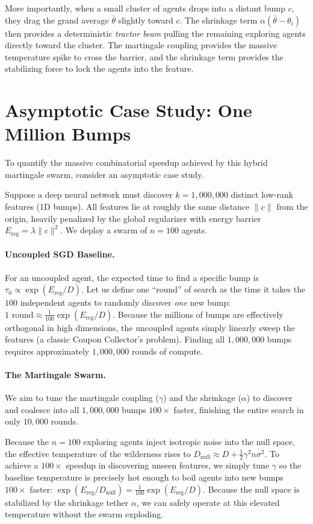 \documentclass{article}
\begin{document}
More importantly, when a small cluster of agents drops into a distant bump $c$, they drag the grand average $\bar{\theta}$ slightly toward $c$. The shrinkage term $\alpha(\bar{\theta} - \theta_i)$ then provides a deterministic \emph{tractor beam} pulling the remaining exploring agents directly toward the cluster. The martingale coupling provides the massive temperature spike to cross the barrier, and the shrinkage term provides the stabilizing force to lock the agents into the feature.

\section{Asymptotic Case Study: One Million Bumps}

To quantify the massive combinatorial speedup achieved by this hybrid martingale swarm, consider an asymptotic case study. 

Suppose a deep neural network must discover $k = 1,000,000$ distinct low-rank features (1D bumps). All features lie at roughly the same distance $\|c\|$ from the origin, heavily penalized by the global regularizer with energy barrier $E_{\text{reg}} = \lambda \|c\|^2$. We deploy a swarm of $n=100$ agents.

\paragraph{Uncoupled SGD Baseline.}
For an uncoupled agent, the expected time to find a specific bump is $\tau_0 \propto \exp(E_{\text{reg}}/D)$. Let us define one ``round'' of search as the time it takes the $100$ independent agents to randomly discover \emph{one} new bump: $1 \text{ round} \approx \frac{1}{100} \exp(E_{\text{reg}}/D)$.
Because the millions of bumps are effectively orthogonal in high dimensions, the uncoupled agents simply linearly sweep the features (a classic Coupon Collector's problem). Finding all $1,000,000$ bumps requires approximately $1,000,000$ rounds of compute.

\paragraph{The Martingale Swarm.}
We aim to tune the martingale coupling ($\gamma$) and the shrinkage ($\alpha$) to discover and coalesce into all $1,000,000$ bumps $100\times$ faster, finishing the entire search in only $10,000$ rounds.

Because the $n=100$ exploring agents inject isotropic noise into the null space, the effective temperature of the wilderness rises to $D_{\text{null}} \approx D + \frac{1}{2} \gamma^2 n \sigma^2$. To achieve a $100\times$ speedup in discovering unseen features, we simply tune $\gamma$ so the baseline temperature is precisely hot enough to boil agents into new bumps $100\times$ faster: $\exp(E_{\text{reg}} / D_{\text{null}}) = \frac{1}{100} \exp(E_{\text{reg}}/D)$. Because the null space is stabilized by the shrinkage tether $\alpha$, we can safely operate at this elevated temperature without the swarm exploding.
\end{document}
